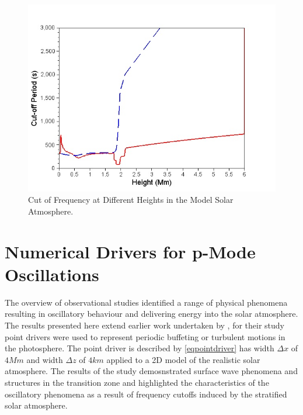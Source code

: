 \documentclass[final,1p]{elsarticle}
\begin{document}

\begin{figure}[h]\label{cutofffrequency_fig4}
\includegraphics[scale=0.7]{images/cutofffrequency_fig4.jpg}
\caption{Cut of Frequency at Different Heights in the Model  Solar Atmosphere. }
\end{figure}





\section{Numerical Drivers for p-Mode Oscillations}
The overview of observational studies identified a range of physical phenomena resulting in oscillatory behaviour and delivering energy into the solar atmosphere.  The results presented here extend earlier work undertaken by  \cite{Malins2007A}, for their study point drivers were used to represent periodic buffeting or turbulent motions in the photosphere. The point driver is described by \eqref{eqpointdriver} has width  $\Delta x$ of $4Mm$ and width $\Delta z$  of $4km$ applied to a 2D model of the realistic solar atmosphere. The results of the study demosnstrated surface wave phenomena and structures in the transition zone and highlighted the characteristics of the oscillatory phenomena as a result of frequency cutoffs induced by the stratified solar atmosphere. 
\end{document}
